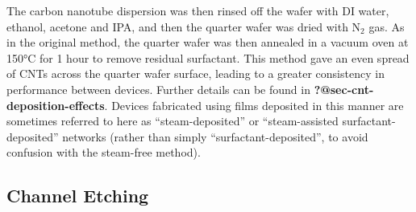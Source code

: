 \documentclass[
  a4paper,
]{scrbook}
\begin{document}
The carbon nanotube dispersion was then rinsed off the wafer with DI
water, ethanol, acetone and IPA, and then the quarter wafer was dried
with N\(_2\) gas. As in the original method, the quarter wafer was then
annealed in a vacuum oven at 150°C for 1 hour to remove residual
surfactant. This method gave an even spread of CNTs across the quarter
wafer surface, leading to a greater consistency in performance between
devices. Further details can be found in
\textbf{?@sec-cnt-deposition-effects}. Devices fabricated using films
deposited in this manner are sometimes referred to here as
``steam-deposited'' or ``steam-assisted surfactant-deposited'' networks
(rather than simply ``surfactant-deposited'', to avoid confusion with
the steam-free method).

\hypertarget{channel-etching}{%
\subsection{Channel Etching}\label{channel-etching}}
\end{document}

